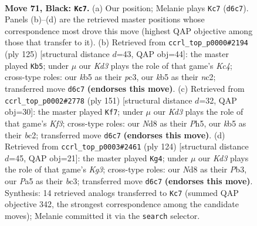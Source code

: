 \documentclass[11pt]{article}
\begin{document}
\clearpage

\begin{figure}[p]\centering
\begin{subfigure}{0.46\textwidth}\centering
\resizebox{\linewidth}{!}{%
\newchessgame
\chessboard[
  setfen={3n4/6p1/1p1k2p1/pKpp4/8/1PP5/8/8 b - - 6 71},
  showmover=false,
  pgfstyle=straightmove, color=movearrow, markmove={d6-c7}
]}
\caption{}
\end{subfigure}\hfill
\begin{subfigure}{0.46\textwidth}\centering
\resizebox{\linewidth}{!}{%
\newchessgame
\chessboard[
  setfen={8/8/6Kp/p1k5/1pp5/2P5/1PN5/8 b - - 1 63},
  showmover=false,
  pgfstyle=straightmove, color=movearrow, markmove={c5-b5}
]}
\caption{}
\end{subfigure}
\\[4pt]
\begin{subfigure}{0.46\textwidth}\centering
\resizebox{\linewidth}{!}{%
\newchessgame
\chessboard[
  setfen={8/8/5kp1/2p1pp1p/2P1p2P/4K1P1/2B5/8 b - - 35 76},
  showmover=false,
  pgfstyle=straightmove, color=movearrow, markmove={f6-f7}
]}
\caption{}
\end{subfigure}\hfill
\begin{subfigure}{0.46\textwidth}\centering
\resizebox{\linewidth}{!}{%
\newchessgame
\chessboard[
  setfen={8/8/3p1k1p/2pP1P2/5P2/1PbB2KP/8/8 w - - 3 63},
  showmover=false,
  pgfstyle=straightmove, color=movearrow, markmove={g3-g4}
]}
\caption{}
\end{subfigure}
\caption{\textbf{Move 71, Black: \texttt{Kc7}.} (a) Our position; Melanie plays \texttt{Kc7} (\texttt{d6c7}). Panels (b)--(d) are the retrieved master positions whose correspondence most drove this move (highest QAP objective among those that transfer to it). (b) Retrieved from \texttt{ccrl\_top\_p0000\#2194} (ply 125) [structural distance $d$=43, QAP obj=44]: the master played \texttt{Kb5}; under $\mu$ our \emph{Kd3} plays the role of that game's \emph{Kc4}; cross-type roles: our \emph{k}b5 as their \emph{p}c3, our \emph{k}b5 as their \emph{n}c2; transferred move \texttt{d6c7} \textbf{(endorses this move)}. (c) Retrieved from \texttt{ccrl\_top\_p0002\#2778} (ply 151) [structural distance $d$=32, QAP obj=30]: the master played \texttt{Kf7}; under $\mu$ our \emph{Kd3} plays the role of that game's \emph{Kf3}; cross-type roles: our \emph{N}d8 as their \emph{P}h5, our \emph{k}b5 as their \emph{b}c2; transferred move \texttt{d6c7} \textbf{(endorses this move)}. (d) Retrieved from \texttt{ccrl\_top\_p0003\#2461} (ply 124) [structural distance $d$=45, QAP obj=21]: the master played \texttt{Kg4}; under $\mu$ our \emph{Kd3} plays the role of that game's \emph{Kg3}; cross-type roles: our \emph{N}d8 as their \emph{P}b3, our \emph{P}a5 as their \emph{b}c3; transferred move \texttt{d6c7} \textbf{(endorses this move)}. Synthesis: 14 retrieved analogs transferred to \texttt{Kc7} (summed QAP objective 342, the strongest correspondence among the candidate moves); Melanie committed it via the \texttt{search} selector.}
\label{fig:thought-m141}
\end{figure}
\end{document}
